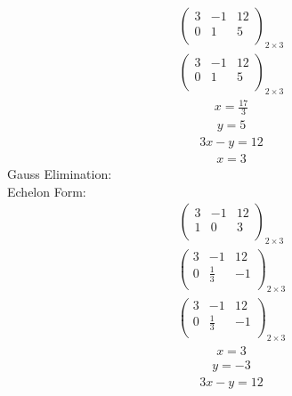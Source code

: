 \documentclass{article}
\begin{document}
\begin{align*}
\left(
\begin{array}{cc|c}
3 & -1 & 12\\
0 & 1 & 5\\
\end{array}
\right)_{2\times 3}
\end{align*}
\begin{align*}
\left(
\begin{array}{cc|c}
3 & -1 & 12\\
0 & 1 & 5\\
\end{array}
\right)_{2\times 3}
\end{align*}
\begin{align*}
x=\frac{17}{3}\end{align*}
\begin{align*}
y=5\end{align*}
\begin{align*}
3x - y=12\end{align*}
\begin{align*}
x=3\end{align*}
Gauss Elimination:\\
Echelon Form:\\
\begin{align*}
\left(
\begin{array}{cc|c}
3 & -1 & 12\\
1 & 0 & 3\\
\end{array}
\right)_{2\times 3}
\end{align*}
\begin{align*}
\left(
\begin{array}{cc|c}
3 & -1 & 12\\
0 & \frac{1}{3} & -1\\
\end{array}
\right)_{2\times 3}
\end{align*}
\begin{align*}
\left(
\begin{array}{cc|c}
3 & -1 & 12\\
0 & \frac{1}{3} & -1\\
\end{array}
\right)_{2\times 3}
\end{align*}
\begin{align*}
x=3\end{align*}
\begin{align*}
y=-3\end{align*}
\begin{align*}
3x - y=12\end{align*}
\end{document}
